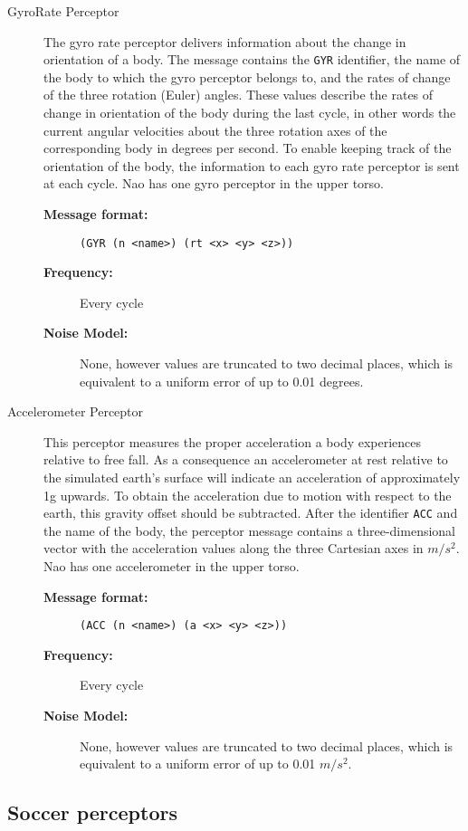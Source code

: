 \begin{description}
  \item [GyroRate Perceptor]
  The gyro rate perceptor delivers information about the change in orientation of a body. The message contains the \texttt{GYR} identifier, the name of the body to which the gyro perceptor belongs to, and the rates of change of the three rotation (Euler) angles. These values describe the rates of change in orientation of the body during the last cycle, in other words the current angular velocities about the three rotation axes of the corresponding body in degrees per second. To enable keeping track of the orientation of the body, the information to each gyro rate perceptor is sent at each cycle. Nao has one gyro perceptor in the upper torso.
  \begin{description}
  \item[{\bf Message format:}]
  \texttt{(GYR (n <name>) (rt <x> <y> <z>))}
  \item[{\bf Frequency:}]
  Every cycle
  \item[{\bf Noise Model:}]None, however values are truncated to two decimal places, which is equivalent to a uniform error of up to 0.01 degrees.
  \end{description}

  \item [Accelerometer Perceptor]
  This perceptor measures the proper acceleration a body experiences relative to free fall. As a consequence an accelerometer at rest relative to the simulated earth's surface will indicate an acceleration of approximately 1g upwards. To obtain the acceleration due to motion with respect to the earth, this gravity offset should be subtracted. After the identifier \texttt{ACC} and the name of the body, the perceptor message contains a three-dimensional vector with the acceleration values along the three Cartesian axes in $m/s^2$. Nao has one accelerometer in the upper torso.
    \begin{description}
  \item[{\bf Message format:}]
  \texttt{(ACC (n <name>) (a <x> <y> <z>))}
  \item[{\bf Frequency:}]
  Every cycle
  \item[{\bf Noise Model:}]None, however values are truncated to two decimal places, which is equivalent to a uniform error of up to 0.01 $m/s^{2}$.
  \end{description}
\end{description}

\subsection{Soccer perceptors}
\label{sec:soccerperceptors}

